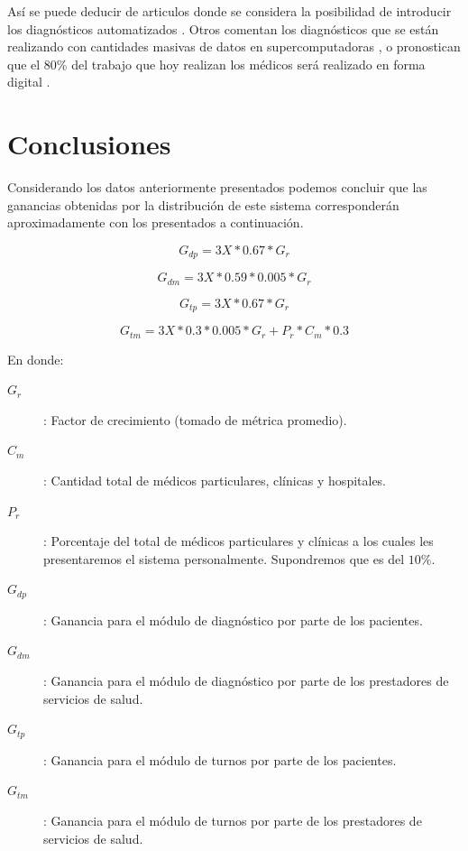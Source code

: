 \documentclass[a4paper,10pt]{article}
\begin{document}
Así se puede deducir de articulos donde se considera la posibilidad de introducir los diagnósticos automatizados  \cite{link9}. Otros comentan los diagnósticos que se están realizando con cantidades masivas de datos en supercomputadoras \cite{link10}, o pronostican que el $80\%$ del trabajo que hoy realizan los médicos será realizado en forma digital \cite{link11}.



\section{Conclusiones}

Considerando los datos anteriormente presentados podemos concluir que las ganancias obtenidas por la distribución de este sistema corresponderán aproximadamente con los presentados a continuación.

\begin{equation}
\label{eq:diag_personas}
G_{dp} = 3 X * 0.67 * G_r
\end{equation}

\begin{equation}
\label{eq:diag_medicos}
G_{dm} = 3 X * 0.59 * 0.005 * G_r 
\end{equation}

\begin{equation}
\label{eq:tur_pacientes}
G_{tp} = 3 X * 0.67 * G_r
\end{equation}

\begin{equation}
\label{eq:tur_medicos}
G_{tm} = 3 X * 0.3 * 0.005 * G_r + P_r * C_m * 0.3
\end{equation}

En donde:
\begin{description}
\item[$G_r$]: Factor de crecimiento (tomado de métrica promedio).
\item[$C_m$]: Cantidad total de médicos particulares, clínicas y hospitales. 
\item[$P_r$]: Porcentaje del total de médicos particulares y clínicas a los cuales les presentaremos el sistema personalmente. Supondremos que es del $10\%$.
\item[$G_{dp}$]: Ganancia para el módulo de diagnóstico por parte de los pacientes.
\item[$G_{dm}$]: Ganancia para el módulo de diagnóstico por parte de los prestadores de servicios de salud.
\item[$G_{tp}$]: Ganancia para el módulo de turnos por parte de los pacientes.
\item[$G_{tm}$]: Ganancia para el módulo de turnos por parte de los prestadores de servicios de salud.
\end{description}
 
\end{document}
